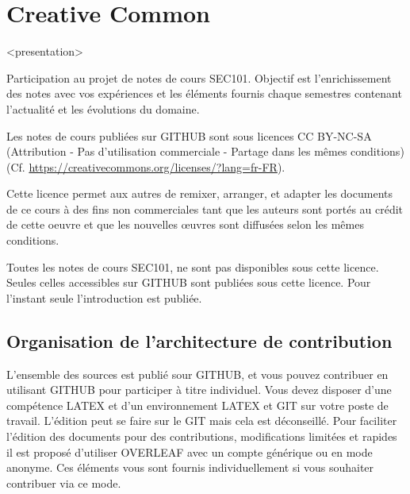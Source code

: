 

\section{Creative Common}


\begin{frame}<presentation>

Participation au projet de notes de cours SEC101. Objectif est l'enrichissement des notes avec vos expériences et les éléments fournis chaque semestres contenant l'actualité et les évolutions du domaine.

\end{frame}

\begin{frame}

	
Les notes de cours publiées sur GITHUB sont sous licences CC BY-NC-SA (Attribution - Pas d’utilisation commerciale - Partage dans les mêmes conditions)(Cf. \url{https://creativecommons.org/licenses/?lang=fr-FR}).

Cette licence permet aux autres de remixer, arranger, et adapter les documents de ce cours à des fins non commerciales tant que les auteurs sont portés au crédit de cette oeuvre et que les nouvelles œuvres sont diffusées selon les mêmes conditions.

\end{frame}

Toutes les notes de cours SEC101, ne sont pas disponibles sous cette licence. Seules celles accessibles sur GITHUB sont publiées sous cette licence. Pour l'instant seule l'introduction est publiée.




\subsection{Organisation de l'architecture de contribution}

L'ensemble des sources est publié sour GITHUB, et vous pouvez contribuer en utilisant GITHUB pour participer à titre individuel. Vous devez disposer d'une compétence LATEX et d'un environnement LATEX et GIT sur votre poste de travail. L'édition peut se faire sur le GIT mais cela est déconseillé. Pour faciliter l'édition des documents pour des contributions, modifications limitées et rapides il est proposé d'utiliser OVERLEAF avec un compte générique ou en mode anonyme. Ces éléments vous sont fournis individuellement si vous souhaiter contribuer via ce mode.

